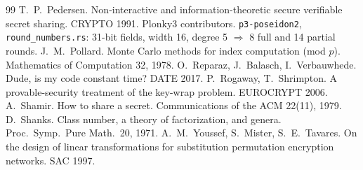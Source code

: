 \documentclass[10pt,a4paper]{article}
\newcommand{\code}[1]{\texttt{#1}}
\theoremstyle{definition}
\theoremstyle{remark}
\begin{document}
\begin{thebibliography}{99}
 T.~P.~Pedersen. Non-interactive and information-theoretic secure verifiable secret sharing. CRYPTO 1991.
 Plonky3 contributors. \code{p3-poseidon2}, \code{round\_numbers.rs}: 31-bit fields, width 16, degree 5 $\Rightarrow$ 8 full and 14 partial rounds.
 J.~M.~Pollard. Monte Carlo methods for index computation (mod $p$). Mathematics of Computation 32, 1978.
 O.~Reparaz, J.~Balasch, I.~Verbauwhede. Dude, is my code constant time? DATE 2017.
 P.~Rogaway, T.~Shrimpton. A provable-security treatment of the key-wrap problem. EUROCRYPT 2006.
 A.~Shamir. How to share a secret. Communications of the ACM 22(11), 1979.
 D.~Shanks. Class number, a theory of factorization, and genera. Proc.\ Symp.\ Pure Math.\ 20, 1971.
 A.~M.~Youssef, S.~Mister, S.~E.~Tavares. On the design of linear transformations for substitution permutation encryption networks. SAC 1997.
\end{thebibliography}
\end{document}
